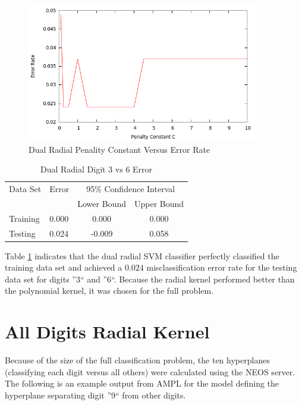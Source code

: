 \documentclass{article}
\begin{document}
\begin{figure}
\centering
\includegraphics[width=0.9\textwidth]{radial_c_vs_error_rate.png}
\caption{Dual Radial Penality Constant Versus Error Rate}
\label{cvserror2}
\end{figure}

\begin{table}
\caption{Dual Radial Digit 3 vs 6 Error}
\begin{center}
\begin{tabular}{llcc}
\toprule
Data Set & Error & \multicolumn{2}{c}{95\% Confidence Interval} \\
\cmidrule(r){3-4}
& & Lower Bound & Upper Bound \\
\midrule
Training & 0.000 & 0.000 & 0.000 \\
Testing & 0.024 & -0.009 & 0.058 \\
\bottomrule
\end{tabular}
\end{center}
\label{table4}
\end{table}

Table \ref{table4} indicates that the dual radial SVM classifier perfectly classified the training data set and achieved a \(0.024\) misclassification error rate for the testing data set for digits ''3`` and ''6``. Because the radial kernel performed better than the polynomial kernel, it was chosen for the full problem.

\section{All Digits Radial Kernel}\label{full1}

Because of the size of the full classification problem, the ten hyperplanes (classifying each digit versus all others) were calculated using the NEOS server. The following is an example output from AMPL for the model defining the hyperplane separating digit ''9`` from other digits.
\end{document}
